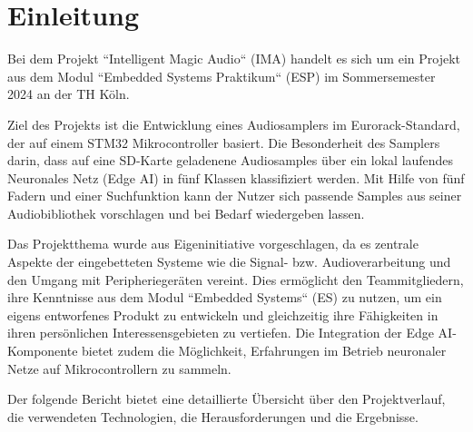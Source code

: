 \newpage
\section{Einleitung}
Bei dem Projekt ``Intelligent Magic Audio`` (IMA) handelt es sich um ein Projekt aus dem Modul ``Embedded Systems Praktikum`` (ESP) im Sommersemester 2024 an der TH Köln.

Ziel des Projekts ist die Entwicklung eines Audiosamplers im Eurorack-Standard, der auf einem STM32 Mikrocontroller basiert. Die Besonderheit des Samplers darin, dass auf eine SD-Karte geladenene Audiosamples über ein lokal laufendes Neuronales Netz (Edge AI) in fünf Klassen klassifiziert werden. Mit Hilfe von fünf Fadern und einer Suchfunktion kann der Nutzer sich passende Samples aus seiner Audiobibliothek vorschlagen und bei Bedarf wiedergeben lassen. 

Das Projektthema wurde aus Eigeninitiative vorgeschlagen, da es zentrale Aspekte der eingebetteten Systeme wie die Signal- bzw. Audioverarbeitung und den Umgang mit Peripheriegeräten vereint. Dies ermöglicht den Teammitgliedern, ihre Kenntnisse aus dem Modul ``Embedded Systems`` (ES) zu nutzen, um ein eigens entworfenes Produkt zu entwickeln und gleichzeitig ihre Fähigkeiten in ihren persönlichen Interessensgebieten zu vertiefen. Die Integration der Edge AI-Komponente bietet zudem die Möglichkeit, Erfahrungen im Betrieb neuronaler Netze auf Mikrocontrollern zu sammeln.

Der folgende Bericht bietet eine detaillierte Übersicht über den Projektverlauf, die verwendeten Technologien, die Herausforderungen und die Ergebnisse.
